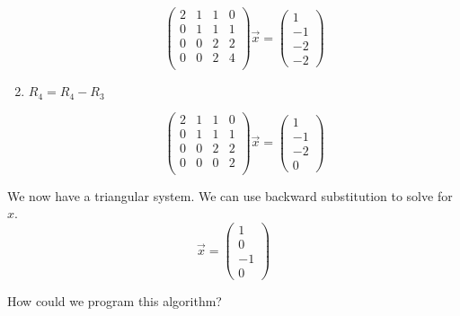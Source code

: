 \begin{example}
\begin{enumerate}
              \[
                  \begin{pmatrix}
                      2 & 1 & 1 & 0 \\
                      0 & 1 & 1 & 1 \\
                      0 & 0 & 2 & 2 \\
                      0 & 0 & 2 & 4 \\
                  \end{pmatrix}
                  \vec{x}
                  =
                  \begin{pmatrix}
                      1 \\ -1 \\ -2 \\ -2
                  \end{pmatrix}
              \]

        \item \( R_4 = R_4 - R_3 \)

              \[
                  \begin{pmatrix}
                      2 & 1 & 1 & 0 \\
                      0 & 1 & 1 & 1 \\
                      0 & 0 & 2 & 2 \\
                      0 & 0 & 0 & 2 \\
                  \end{pmatrix}
                  \vec{x}
                  =
                  \begin{pmatrix}
                      1 \\ -1 \\ -2 \\ 0
                  \end{pmatrix}
              \]
    \end{enumerate}

    We now have a triangular system. We can use backward substitution to solve for \( x \). \[
        \vec{x} = \begin{pmatrix}
            1 \\ 0 \\ -1 \\ 0
        \end{pmatrix}
    \]

    How could we program this algorithm?
\end{example}

